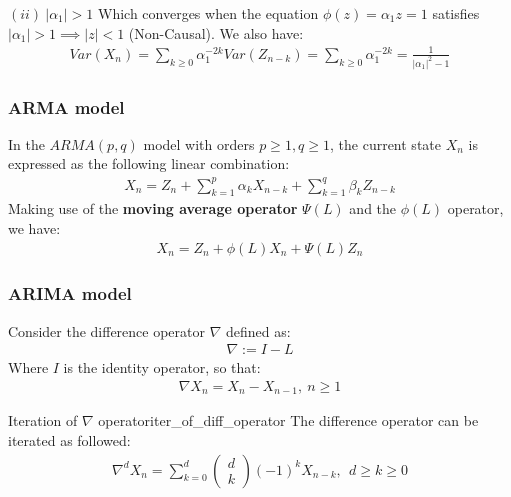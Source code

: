 \begin{proof*}
\begin{subproof}{\newline $(ii) \ |\alpha_1| > 1$}
        \noindent Which converges when the equation $\phi(z)=\alpha_1z=1$ satisfies $|\alpha_1| > 1 \implies |z| < 1$ (Non-Causal).
        \noindent We also have:
        \begin{align*}
            Var(X_n) = \sum_{k\ge0} \alpha_1^{-2k}Var(Z_{n-k}) = \sum_{k\ge0}\alpha_1^{-2k} = \frac{1}{|\alpha_1|^2-1}
        \end{align*}
    \end{subproof}
\end{proof*}

\subsubsection{\textbf{ARMA} model}
\begin{definition}
    In the $ARMA(p,q)$ model with orders $p\ge1, q\ge1$, the current state $X_n$ is expressed as the following linear combination:
    \begin{align*}
        \boxed{
            X_n = Z_n + \sum_{k=1}^p \alpha_k X_{n-k} + \sum_{k=1}^q \beta_k Z_{n-k} 
        }
    \end{align*}
    \noindent Making use of the \textbf{moving average operator} $\Psi(L)$ and the $\phi(L)$ operator, we have:
    \begin{align*}
        \boxed{
            X_n =  Z_n + \phi(L)X_n + \Psi(L)Z_n
        }
    \end{align*}
\end{definition}


\subsubsection{\textbf{ARIMA} model}
\begin{definition}
    Consider the difference operator $\nabla$ defined as:
    \begin{align*}
        \nabla := I - L
    \end{align*}
    \noindent Where $I$ is the identity operator, so that:
    \begin{align*}
        \nabla X_n = X_n - X_{n-1}, \ n\ge1
    \end{align*}
\end{definition}

\begin{proposition}{Iteration of $\nabla$ operator}{iter_of_diff_operator}
    The difference operator can be iterated as followed:
    \begin{align*}
        \nabla^d X_n = \sum_{k=0}^d \begin{pmatrix}
            d \\ k
        \end{pmatrix} (-1)^kX_{n-k}, \ \ d \ge k \ge 0
    \end{align*}
\end{proposition}

